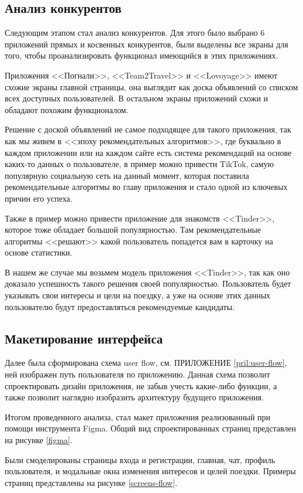 \subsection{Анализ конкурентов}

Следующим этапом стал анализ конкурентов. Для этого было выбрано 6 приложений прямых и косвенных конкурентов, были выделены все экраны для того, чтобы проанализировать функционал имеющийся в этих приложениях.


Приложения <<Погнали>>, <<Team2Travel>> и <<Lovoyage>> имеют схожие экраны  главной страницы, она выглядит как доска объявлений со списком всех доступных пользователей. В остальном экраны приложений схожи и обладают похожим функционалом.

Решение с доской объявлений не самое подходящее для такого приложения, так как мы живем в <<эпоху рекомендательных алгоритмов>>, где буквально в каждом приложении или на каждом сайте есть система рекомендаций на основе каких-то данных о пользователе, в пример можно привести TikTok, самую популярную социальную сеть на данный момент, которая поставила рекомендательные алгоритмы во главу приложения и стало одной из ключевых причин его успеха.

Также в пример можно привести приложение для знакомств <<Tinder>>, которое тоже обладает большой популярностью. Там рекомендательные алгоритмы <<решают>> какой пользователь попадется вам в карточку на основе статистики.

В нашем же случае мы возьмем модель приложения <<Tinder>>, так как оно доказало успешность такого решения своей популярностью. Пользователь будет указывать свои интересы и цели на поездку, а уже на основе этих данных пользователю будут предоставляться рекомендуемые кандидаты.

\subsection{Макетирование интерфейса}

Далее была сформирована схема user flow, см. ПРИЛОЖЕНИЕ \ref{pril:user-flow}, ней изображен путь пользователя по приложению. Данная схема позволит спроектировать дизайн приложения, не забыв учесть какие-либо функции, а также позволит наглядно изобразить архитектуру будущего приложения.

Итогом проведенного анализа, стал макет приложения реализованный при помощи инструмента Figma. Общий вид спроектированных страниц представлен на рисунке \ref{figma}.


Были смоделированы страницы входа и регистрации, главная, чат, профиль пользователя, и модальные окна изменения интересов и целей поездки. Примеры страниц представлены на рисунке \ref{screens-flow}.

